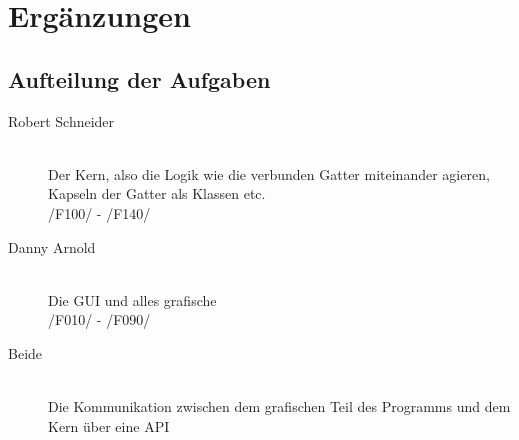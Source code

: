 
\section{Ergänzungen}


\subsection{Aufteilung der Aufgaben}

\begin{description}
	\item[Robert Schneider] ~ \\ Der Kern, also die Logik wie die verbunden Gatter miteinander agieren, Kapseln der Gatter als Klassen etc.\\
	/F100/ - /F140/
	\item[Danny Arnold] ~ \\ Die GUI und alles grafische \\
	/F010/ - /F090/
	\item[Beide] ~ \\ Die Kommunikation zwischen dem grafischen Teil des Programms und dem Kern über eine API
\end{description}